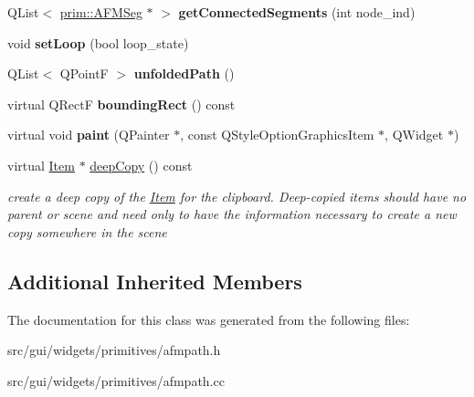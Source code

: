 \begin{DoxyCompactItemize}
\item 
Q\+List$<$ \hyperlink{classprim_1_1AFMSeg}{prim\+::\+A\+F\+M\+Seg} $\ast$ $>$ {\bfseries get\+Connected\+Segments} (int node\+\_\+ind)\hypertarget{classprim_1_1AFMPath_a15aec0328dc067c1cad8451341f360ff}{}\label{classprim_1_1AFMPath_a15aec0328dc067c1cad8451341f360ff}

\item 
void {\bfseries set\+Loop} (bool loop\+\_\+state)\hypertarget{classprim_1_1AFMPath_a35aea52abf0dd8f01a0cdb344372e500}{}\label{classprim_1_1AFMPath_a35aea52abf0dd8f01a0cdb344372e500}

\item 
Q\+List$<$ Q\+PointF $>$ {\bfseries unfolded\+Path} ()\hypertarget{classprim_1_1AFMPath_ab65afe23045cf5b49e7c04dbec3f9c96}{}\label{classprim_1_1AFMPath_ab65afe23045cf5b49e7c04dbec3f9c96}

\item 
virtual Q\+RectF {\bfseries bounding\+Rect} () const \hypertarget{classprim_1_1AFMPath_a1382a9b8f0339dac82fe5ab336951c47}{}\label{classprim_1_1AFMPath_a1382a9b8f0339dac82fe5ab336951c47}

\item 
virtual void {\bfseries paint} (Q\+Painter $\ast$, const Q\+Style\+Option\+Graphics\+Item $\ast$, Q\+Widget $\ast$)\hypertarget{classprim_1_1AFMPath_abc07a60a6fae8631aceb70a6e160b787}{}\label{classprim_1_1AFMPath_abc07a60a6fae8631aceb70a6e160b787}

\item 
virtual \hyperlink{classprim_1_1Item}{Item} $\ast$ \hyperlink{classprim_1_1AFMPath_a1a6c46fb657fd1c684704828541840db}{deep\+Copy} () const \hypertarget{classprim_1_1AFMPath_a1a6c46fb657fd1c684704828541840db}{}\label{classprim_1_1AFMPath_a1a6c46fb657fd1c684704828541840db}

\begin{DoxyCompactList}\small\item\em create a deep copy of the \hyperlink{classprim_1_1Item}{Item} for the clipboard. Deep-\/copied items should have no parent or scene and need only to have the information necessary to create a new copy somewhere in the scene \end{DoxyCompactList}\end{DoxyCompactItemize}
\subsection*{Additional Inherited Members}


The documentation for this class was generated from the following files\+:\begin{DoxyCompactItemize}
\item 
src/gui/widgets/primitives/afmpath.\+h\item 
src/gui/widgets/primitives/afmpath.\+cc\end{DoxyCompactItemize}
